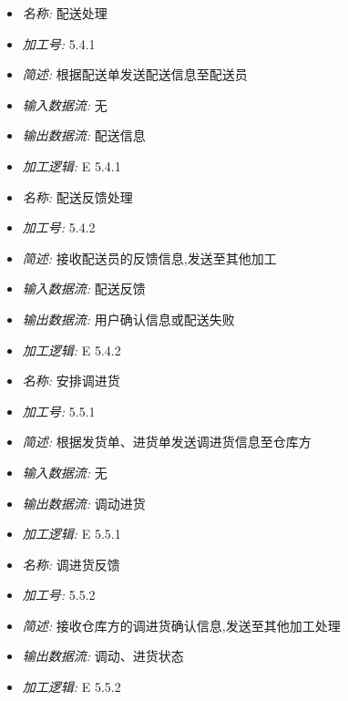\documentclass{article}
\begin{document}
\begin{CJK*}{UTF8}{gbsn}
\begin{itemize}
\item \textit{名称: }配送处理
\item \textit{加工号: }5.4.1
\item \textit{简述: } 根据配送单发送配送信息至配送员 
\item \textit{输入数据流: } 无
\item \textit{输出数据流: } 配送信息
\item \textit{加工逻辑: } E 5.4.1

\end{itemize}


\vspace{-1mm}


\begin{itemize}
\item \textit{名称: }配送反馈处理
\item \textit{加工号: }5.4.2
\item \textit{简述: } 接收配送员的反馈信息,发送至其他加工 
\item \textit{输入数据流: } 配送反馈
\item \textit{输出数据流: } 用户确认信息或配送失败 
\item \textit{加工逻辑: } E 5.4.2

\end{itemize}


\vspace{-1mm}


\begin{itemize}
\item \textit{名称: }安排调进货
\item \textit{加工号: }5.5.1
\item \textit{简述: } 根据发货单、进货单发送调进货信息至仓库方 
\item \textit{输入数据流: } 无
\item \textit{输出数据流: } 调动进货
\item \textit{加工逻辑: } E 5.5.1

\end{itemize}


\vspace{-1mm}


\begin{itemize}
\item \textit{名称: }调进货反馈
\item \textit{加工号: }5.5.2
\item \textit{简述: } 接收仓库方的调进货确认信息,发送至其他加工处理 
\item \textit{输出数据流: } 调动、进货状态
\item \textit{加工逻辑: } E 5.5.2


\end{itemize}
\end{CJK*}
\end{document}
